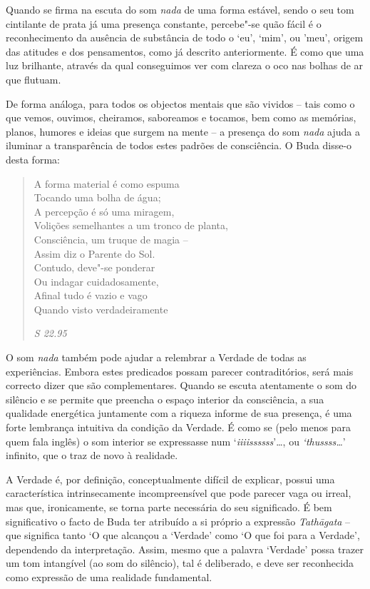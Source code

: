 Quando se firma na escuta do som \emph{nada} de uma forma estável, sendo
o seu tom cintilante de prata já uma presença constante, percebe"-se quão
fácil é o reconhecimento da ausência de substância de todo o `eu',
`mim', ou 'meu', origem das atitudes e dos pensamentos, como já descrito
anteriormente. É como que uma luz brilhante, através da qual conseguimos
ver com clareza o oco nas bolhas de ar que flutuam.

De forma análoga, para todos os objectos mentais que são vividos -- tais
como o que vemos, ouvimos, cheiramos, saboreamos e tocamos, bem como as
memórias, planos, humores e ideias que surgem na mente -- a presença do
som \emph{nada} ajuda a iluminar a transparência de todos estes padrões
de consciência. O Buda disse-o desta forma:

\begin{quote}
A forma material é como espuma\\
Tocando uma bolha de água;\\
A percepção é só uma miragem,\\
Volições semelhantes a um tronco de planta,\\
Consciência, um truque de magia --\\
Assim diz o Parente do Sol.\\
Contudo, deve"-se ponderar\\
Ou indagar cuidadosamente,\\
Afinal tudo é vazio e vago\\
Quando visto verdadeiramente

\emph{S 22.95}
\end{quote}

O som \emph{nada} também pode ajudar a relembrar a Verdade de todas as
experiências. Embora estes predicados possam parecer contraditórios,
será mais correcto dizer que são complementares. Quando se escuta
atentamente o som do silêncio e se permite que preencha o espaço
interior da consciência, a sua qualidade energética juntamente com a
riqueza informe de sua presença, é uma forte lembrança intuitiva da
condição da Verdade. É como se (pelo menos para quem fala inglês) o som
interior se expressasse num `\emph{iiiissssss}'\ldots{}, ou
\emph{`thussss\ldots{}}' infinito, que o traz de novo à realidade.

A Verdade é, por definição, conceptualmente difícil de explicar, possui
uma característica intrinsecamente incompreensível que pode parecer vaga
ou irreal, mas que, ironicamente, se torna parte necessária do seu
significado. É bem significativo o facto de Buda ter atribuído a si
próprio a expressão \emph{Tathāgata} -- que significa tanto `O que
alcançou a `Verdade' como `O que foi para a Verdade', dependendo da
interpretação. Assim, mesmo que a palavra `Verdade' possa trazer um tom
intangível (ao som do silêncio), tal é deliberado, e deve ser
reconhecida como expressão de uma realidade fundamental.

